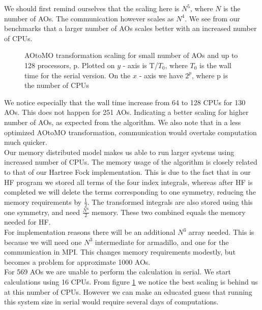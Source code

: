 We should first remind ourselves that the scaling here is $N^5$, where $N$ is
the number of AOs. The communication however scales as $N^4$. We see
from our benchmarks that a larger number of AOs scales better with
an increased number of CPUs. \\
\begin{figure}[h!]
\begin{center}
\caption{AOtoMO transformation scaling for small number of AOs and up to 128 processors, p. Plotted on $y$ - axis is T/$T_0$, where $T_0$ is the wall time for the serial version. On the $x$ - axis we have $2^p$, where p is the number of CPUs}
\label{fig:aotomo1}
\end{center}
\end{figure}

We notice especially that the wall time increase from 64 to 128 CPUs
for 130 AOs. This does not happen for 251 AOs. Indicating a better
scaling for higher number of AOs, as expected from the algorithm. We
also note that in a less optimized AOtoMO transformation,
communication would overtake computation much quicker. \\

Our memory distributed model makes us able to run larger systems using
increased number of CPUs. The memory usage of the algorithm is closely
related to that of our Hartree Fock implementation. This is due to the
fact that in our HF program we stored all terms of the four index
integrals, whereas after HF is completed we will delete the terms
corresponding to one symmetry, reducing the memory requirements by
$\frac{1}{2}$. The transformed integrals are also stored using this
one symmetry, and need $\frac{N^4}{2}$ memory. These two combined
equals the memory needed for HF. \\

For implementation reasons there will be an additional $N^3$ array
needed. This is because we will need one $N^3$ intermediate for
armadillo, and one for the communication in MPI. This changes memory
requirements modestly, but becomes a problem for approximate 1000
AOs. \\

For 569 AOs we are unable to perform the calculation in serial. We
start calculations using 16 CPUs. From figure \ref{fig:aotomo1} we
notice the best scaling is behind us at this number of CPUs. However
we can make an educated guess that running this system size in serial
would require several days of computations. \\

